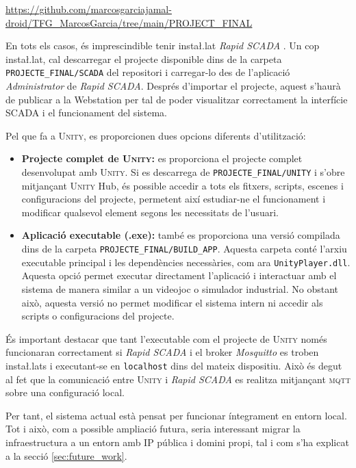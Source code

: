 \documentclass[a4paper,11pt,DIV=13,headings=normal,abstract=true,twoside=semi]{article}
\newcommand{\acro}[1]{\textsc{#1}}
\let\fitx\nolinkurl
\begin{document}
\begin{center}
\footnotesize
\href{https://github.com/marcosgarciajamal-droid/TFG_MarcosGarcia/tree/main/PROJECT_FINAL}{https://github.com/marcosgarciajamal-droid/TFG\_MarcosGarcia/tree/main/PROJECT\_FINAL}
\end{center}

En tots els casos, és imprescindible tenir insta\l.lat \emph{Rapid SCADA} \cite{rapidscada_windows_install}. Un cop insta\l.lat, cal descarregar el projecte disponible dins de la carpeta \fitx{PROJECTE_FINAL/SCADA} del repositori i carregar-lo des de l'aplicació \emph{Administrator} de \emph{Rapid SCADA}. Després d'importar el projecte, aquest s'haurà de publicar a la Webstation per tal de poder visualitzar correctament la interfície \acro{SCADA} i el funcionament del sistema.

Pel que fa a \acro{Unity}, es proporcionen dues opcions diferents d'utilització:

\begin{itemize}
    \item \textbf{Projecte complet de \acro{Unity}:} es proporciona el projecte complet desenvolupat amb \acro{Unity}. Si es descarrega de \fitx{PROJECTE_FINAL/UNITY} i s'obre mitjançant \acro{Unity} Hub, és possible accedir a tots els fitxers, scripts, escenes i configuracions del projecte, permetent així estudiar-ne el funcionament i modificar qualsevol element segons les necessitats de l'usuari.
    \item \textbf{Aplicació executable (.exe):} també es proporciona una versió compilada dins de la carpeta \fitx{PROJECTE_FINAL/BUILD_APP}. Aquesta carpeta conté l'arxiu executable principal i les dependències necessàries, com ara \fitx{UnityPlayer.dll}. Aquesta opció permet executar directament l'aplicació i interactuar amb el sistema de manera similar a un videojoc o simulador industrial. No obstant això, aquesta versió no permet modificar el sistema intern ni accedir als scripts o configuracions del projecte.
\end{itemize}

És important destacar que tant l'executable com el projecte de \acro{Unity} només funcionaran correctament si \emph{Rapid SCADA} i el broker \textit{Mosquitto} es troben insta\l.lats i executant-se en \texttt{localhost} dins del mateix dispositiu. Això és degut al fet que la comunicació entre \acro{Unity} i \emph{Rapid SCADA} es realitza mitjançant \acro{mqtt} sobre una configuració local.

Per tant, el sistema actual està pensat per funcionar íntegrament en entorn local. Tot i això, com a possible ampliació futura, seria interessant migrar la infraestructura a un entorn amb IP pública i domini propi, tal i com s'ha explicat a la secció \ref{sec:future_work}.
\end{document}
